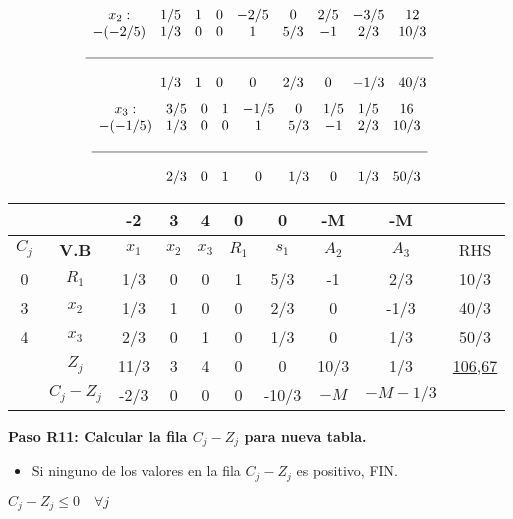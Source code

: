 \documentclass{templateNote}
\begin{document}
\begin{equation*}
    \begin{array}{ccccccccc}
        x_2: & 1/5 & 1 & 0 & -2/5 & 0 & 2/5 & -3/5 & 12 \\
        -(-2/5) & 1/3 & 0 & 0 & 1 & 5/3 & -1 & 2/3 & 10/3 \\
        \\ \hline \\
        & 1/3 & 1 & 0 & 0 & 2/3 & 0 & -1/3 & 40/3
    \end{array}
\end{equation*}
\vspace{0.5cm}
\begin{equation*}
    \begin{array}{ccccccccc}
        x_3: & 3/5 & 0 & 1 & -1/5 & 0 & 1/5 & 1/5 & 16 \\
        -(-1/5) & 1/3 & 0 & 0 & 1 & 5/3 & -1 & 2/3 & 10/3 \\
        \\ \hline \\
        & 2/3 & 0 & 1 & 0 & 1/3 & 0 & 1/3 & 50/3
    \end{array}
\end{equation*}
\newpage
\begin{center}
    \begin{tabular}{|c|c|c|c|c|c|c|c|c|c|}
        \hline
        & & -2 & 3 & 4 & 0 & 0 & -M & -M & \\ \hline
        $C_j$ & \textbf{V.B} & $x_1$ & $x_2$ & $x_3$ & $R_1$ & $s_1$ & $A_2$ & $A_3$ & RHS \\ \hline
        0 & $R_1$ & 1/3 & 0 & 0 & 1 & 5/3 & -1 & 2/3 & 10/3 \\ \hline
        3 & $x_2$ & 1/3 & 1 & 0 & 0 & 2/3 & 0 & -1/3 & 40/3 \\ \hline
        4 & $x_3$ & 2/3 & 0 & 1 & 0 & 1/3 & 0 & 1/3 & 50/3 \\ \hline
        & $Z_j$ & 11/3 & 3 & 4 & 0 & 0 & 10/3 & 1/3 & \underline{106,67} \\ \hline
        & $C_j - Z_j$ & -2/3 & 0 & 0 & 0 & -10/3 & $-M$ & $-M-1/3$ & \\ \hline
    \end{tabular}
\end{center}

\textbf{Paso R11: Calcular la fila $C_j - Z_j$ para nueva tabla.}
\begin{itemize}
    \item Si ninguno de los valores en la fila $C_j - Z_j$ es positivo,  FIN.
\end{itemize}
\begin{center}
    $C_j - Z_j \leq 0 \quad \forall j$
\end{center}
\end{document}

